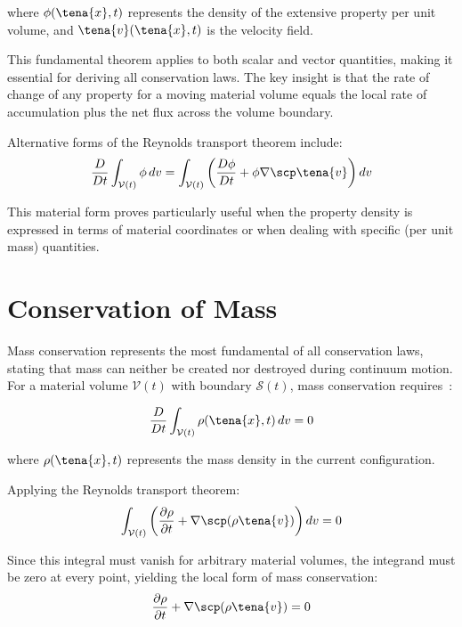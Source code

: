 where $\phi(\tena{x}, t)$ represents the density of the extensive property per unit volume, and $\tena{v}(\tena{x}, t)$ is the velocity field.

This fundamental theorem applies to both scalar and vector quantities, making it essential for deriving all conservation laws. The key insight is that the rate of change of any property for a moving material volume equals the local rate of accumulation plus the net flux across the volume boundary.

Alternative forms of the Reynolds transport theorem include:
\begin{equation}
\frac{D}{Dt}\int_{\mathcal{V}(t)} \phi \, dv = \int_{\mathcal{V}(t)} \left(\frac{D\phi}{Dt} + \phi \nabla \scp \tena{v}\right) dv
\end{equation}

This material form proves particularly useful when the property density is expressed in terms of material coordinates or when dealing with specific (per unit mass) quantities.

\section{Conservation of Mass}

Mass conservation represents the most fundamental of all conservation laws, stating that mass can neither be created nor destroyed during continuum motion. For a material volume $\mathcal{V}(t)$ with boundary $\mathcal{S}(t)$, mass conservation requires~\autocite{Sadd.2019}:

\begin{equation}
\frac{D}{Dt}\int_{\mathcal{V}(t)} \rho(\tena{x}, t) \, dv = 0
\end{equation}

where $\rho(\tena{x}, t)$ represents the mass density in the current configuration.

Applying the Reynolds transport theorem:
\begin{equation}
\int_{\mathcal{V}(t)} \left(\frac{\partial \rho}{\partial t} + \nabla \scp (\rho \tena{v})\right) dv = 0
\end{equation}

Since this integral must vanish for arbitrary material volumes, the integrand must be zero at every point, yielding the local form of mass conservation:
\begin{equation}
\frac{\partial \rho}{\partial t} + \nabla \scp (\rho \tena{v}) = 0
\end{equation}

